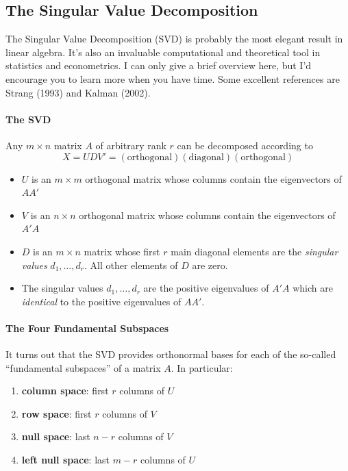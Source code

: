 \documentclass[12pt]{article}
\theoremstyle{definition}
\begin{document}
\subsection{The Singular Value Decomposition}
The Singular Value Decomposition (SVD) is probably the most elegant result in linear algebra. It's also an invaluable computational and theoretical tool in statistics and econometrics. I can only give a brief overview here, but I'd encourage you to learn more when you have time. Some excellent references are Strang (1993) and Kalman (2002).

\paragraph{The SVD} Any $m \times n$ matrix $A$ of arbitrary rank $r$ can be decomposed according to 
	$$X = UDV' = (\mbox{orthogonal})(\mbox{diagonal})(\mbox{orthogonal})$$
	\begin{itemize}
	 	\item $U$ is an $m\times m$ orthogonal matrix whose columns contain the eigenvectors of $AA'$
	 	\item $V$ is an $n\times n$ orthogonal matrix whose columns contain the eigenvectors of $A'A$
	 	\item $D$ is an $m\times n$ matrix whose first $r$ main diagonal elements are the  \emph{singular values} $d_1, \hdots, d_r$. All other elements of $D$ are zero.
	 	\item The singular values $d_1, \hdots, d_r$ are the positive eigenvalues of $A'A$ which are \emph{identical} to the positive eigenvalues of $AA'$.
	 \end{itemize} 

\paragraph{The Four Fundamental Subspaces} It turns out that the SVD provides orthonormal bases for each of the so-called ``fundamental subspaces'' of a matrix $A$. In particular:
	\begin{enumerate}
		\item \textbf{column space}: first $r$ columns of $U$
		\item \textbf{row space}: first $r$ columns of $V$
		\item \textbf{null space}: last $n - r$ columns of $V$
		\item \textbf{left null space}: last $m - r$ columns of $U$
	\end{enumerate}
\end{document}
